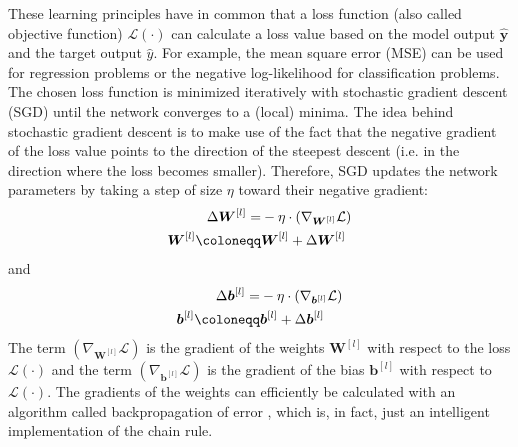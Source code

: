 These learning principles have in common that a loss function (also called objective function) $\mathcal{L}(\cdot)$ can calculate a loss value based on the model output $\boldsymbol{\hat{y}}$ and the target output ${\hat{y}}$. For example, the mean square error (MSE) can be used for regression problems or the negative log-likelihood for classification problems.
The chosen loss function is minimized iteratively with stochastic gradient descent (SGD) until the network converges to a (local) minima.
The idea behind stochastic gradient descent is to make use of the fact that the negative gradient of the loss value points to the direction of the steepest descent (i.e. in the direction where the loss becomes smaller).
Therefore, SGD updates the network parameters by taking a step of size $\eta$ toward their negative gradient:
%
\begin{align}\eqlbl{sgd}
	\begin{aligned}
		\Delta \boldsymbol{W}^{[l]} = & -\eta \cdot \left( \nabla_{\boldsymbol{W}^{[l]}} \mathcal{L} \right)\\
		\boldsymbol{W}^{[l]} \coloneqq & \boldsymbol{W}^{[l]} + \Delta \boldsymbol{W}^{[l]}
	\end{aligned}
\end{align}
%
and
%	
\begin{align}\eqlbl{sgd2}	
	\begin{aligned}
		\Delta \boldsymbol{b}^{[l]} = & -\eta \cdot \left( \nabla_{\boldsymbol{b}^{[l]}} \mathcal{L} \right)\\
		\boldsymbol{b}^{[l]} \coloneqq & \boldsymbol{b}^{[l]} + \Delta \boldsymbol{b}^{[l]}
	\end{aligned}
\end{align}
%
The term $\left( \nabla_{\boldsymbol{W}^{[l]}} \mathcal{L} \right)$ is the gradient of the weights \(\boldsymbol{W}^{[l]}\)  with respect to the loss $\mathcal{L}(\cdot)$ and the term $\left( \nabla_{\boldsymbol{b}^{[l]}} \mathcal{L} \right)$ is the gradient of the bias \(\boldsymbol{b}^{[l]}\)  with respect to $\mathcal{L}(\cdot)$.
The gradients of the weights can efficiently be calculated with an algorithm called backpropagation of error , which is, in fact, just an intelligent implementation of the chain rule.

